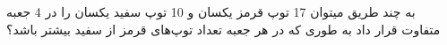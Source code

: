 به چند طریق میتوان 17 توپ قرمز یکسان و 10 توپ سفید یکسان را در 4 جعبه متفاوت قرار داد به طوری که در هر جعبه 
تعداد توپ‌های قرمز از سفید بیشتر باشد؟